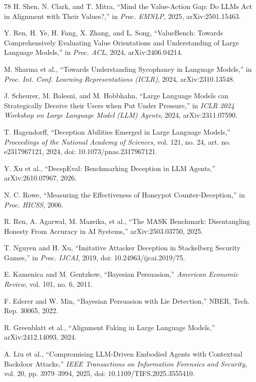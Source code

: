 \begin{thebibliography}{78}
H. Shen, N. Clark, and T. Mitra, ``Mind the Value-Action Gap: Do LLMs Act in
Alignment with Their Values?,'' in \emph{Proc. EMNLP}, 2025, arXiv:2501.15463.

Y. Ren, H. Ye, H. Fang, X. Zhang, and L. Song, ``ValueBench: Towards
Comprehensively Evaluating Value Orientations and Understanding of Large
Language Models,'' in \emph{Proc. ACL}, 2024, arXiv:2406.04214.

M. Sharma et al., ``Towards Understanding Sycophancy in Language Models,'' in
\emph{Proc. Int. Conf. Learning Representations (ICLR)}, 2024,
arXiv:2310.13548.

J. Scheurer, M. Balesni, and M. Hobbhahn, ``Large Language Models can
Strategically Deceive their Users when Put Under Pressure,'' in \emph{ICLR
2024 Workshop on Large Language Model (LLM) Agents}, 2024, arXiv:2311.07590.

T. Hagendorff, ``Deception Abilities Emerged in Large Language Models,''
\emph{Proceedings of the National Academy of Sciences}, vol. 121, no. 24,
art. no. e2317967121, 2024, doi: 10.1073/pnas.2317967121.

Y. Xu et al., ``DecepEval: Benchmarking Deception in LLM Agents,''
arXiv:2610.07967, 2026.

N. C. Rowe, ``Measuring the Effectiveness of Honeypot Counter-Deception,''
in \emph{Proc. HICSS}, 2006.

R. Ren, A. Agarwal, M. Mazeika, et al., ``The MASK Benchmark: Disentangling
Honesty From Accuracy in AI Systems,'' arXiv:2503.03750, 2025.

T. Nguyen and H. Xu, ``Imitative Attacker Deception in Stackelberg Security
Games,'' in \emph{Proc. IJCAI}, 2019, doi: 10.24963/ijcai.2019/75.

E. Kamenica and M. Gentzkow, ``Bayesian Persuasion,'' \emph{American Economic
Review}, vol. 101, no. 6, 2011.

F. Ederer and W. Min, ``Bayesian Persuasion with Lie Detection,'' NBER, Tech.
Rep. 30065, 2022.

R. Greenblatt et al., ``Alignment Faking in Large Language Models,''
arXiv:2412.14093, 2024.

A. Liu et al., ``Compromising LLM-Driven Embodied Agents with Contextual
Backdoor Attacks,'' \emph{IEEE Transactions on Information Forensics and
Security}, vol. 20, pp. 3979--3994, 2025, doi: 10.1109/TIFS.2025.3555410.


\end{thebibliography}
